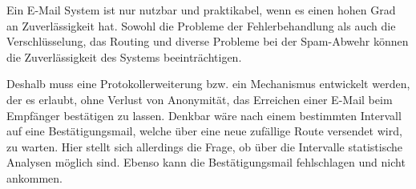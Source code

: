 Ein E-Mail System ist nur nutzbar und praktikabel, wenn es einen hohen Grad an Zuverlässigkeit hat. Sowohl die Probleme der Fehlerbehandlung als auch die Verschlüsselung, das Routing und diverse Probleme bei der Spam-Abwehr können die Zuverlässigkeit des Systems beeinträchtigen.

Deshalb muss eine Protokollerweiterung bzw. ein Mechanismus entwickelt werden, der es erlaubt, ohne Verlust von Anonymität, das Erreichen einer E-Mail beim Empfänger bestätigen zu lassen. Denkbar wäre nach einem bestimmten Intervall auf eine Bestätigungsmail, welche über eine neue zufällige Route versendet wird, zu warten. Hier stellt sich allerdings die Frage, ob über die Intervalle statistische Analysen möglich sind. Ebenso kann die Bestätigungsmail fehlschlagen und nicht ankommen.